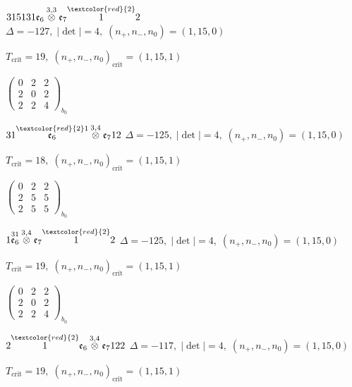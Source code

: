 \documentclass[10pt]{article}
\begin{document}
$315131\mathfrak{e}_6\overset{3,3}{\otimes}\mathfrak{e}_7\overset{\textcolor{red}{2}}{1}2$ \quad $\Delta=-127,\; |\det|=4,\; (n_+,n_-,n_0)=(1,15,0)$

\hspace{1em}$T_{\text{crit}}=19,\; (n_+,n_-,n_0)_{\text{crit}}=(1,15,1)$

\hspace{2em}$\left(\begin{smallmatrix}0 & 2 & 2 \\ 2 & 0 & 2 \\ 2 & 2 & 4\end{smallmatrix}\right)_{\!b_0}$

\smallskip

$31\overset{\textcolor{red}{2}1}{\mathfrak{e}_6}\overset{3,4}{\otimes}\mathfrak{e}_712$ \quad $\Delta=-125,\; |\det|=4,\; (n_+,n_-,n_0)=(1,15,0)$

\hspace{1em}$T_{\text{crit}}=18,\; (n_+,n_-,n_0)_{\text{crit}}=(1,15,1)$

\hspace{2em}$\left(\begin{smallmatrix}0 & 2 & 2 \\ 2 & 5 & 5 \\ 2 & 5 & 5\end{smallmatrix}\right)_{\!b_0}$

$1\overset{31}{\mathfrak{e}_6}\overset{3,4}{\otimes}\mathfrak{e}_7\overset{\textcolor{red}{2}}{1}2$ \quad $\Delta=-125,\; |\det|=4,\; (n_+,n_-,n_0)=(1,15,0)$

\hspace{1em}$T_{\text{crit}}=19,\; (n_+,n_-,n_0)_{\text{crit}}=(1,15,1)$

\hspace{2em}$\left(\begin{smallmatrix}0 & 2 & 2 \\ 2 & 0 & 2 \\ 2 & 2 & 4\end{smallmatrix}\right)_{\!b_0}$

\smallskip

$2\overset{\textcolor{red}{2}}{1}\mathfrak{e}_6\overset{3,4}{\otimes}\mathfrak{e}_7122$ \quad $\Delta=-117,\; |\det|=4,\; (n_+,n_-,n_0)=(1,15,0)$

\hspace{1em}$T_{\text{crit}}=19,\; (n_+,n_-,n_0)_{\text{crit}}=(1,15,1)$
\end{document}
